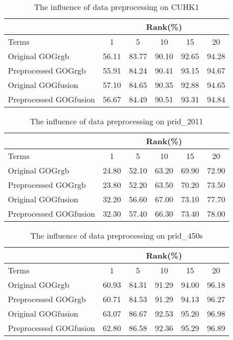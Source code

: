 \begin{table}[H]
\centering
\caption{The influence of data preprocessing on CUHK1}
\begin{tabular}{|l|c|c|c|c|c|}
\hline
 & \multicolumn{5}{|c|}{Rank(\%)} \\
 \hline
Terms  &1 &5 & 10 &15& 20\\
\hline
Original GOGrgb&56.11&83.77&90.10& 92.65&94.28 \\
\hline
Preprocessed GOGrgb &55.91&84.24&90.41& 93.15&94.67\\
 \hline
Original GOGfusion &57.10&84.65& 90.35& 92.88&94.65\\
\hline
Preprocessed GOGfusion &56.67&84.49& 90.51& 93.31&94.84\\
 \hline
 
\end{tabular}
\end{table}
\label{table:compMN2}
\begin{table}[H]
\centering
\caption{The influence of data preprocessing on prid\_2011}
\begin{tabular}{|l|c|c|c|c|c|}
\hline
 & \multicolumn{5}{|c|}{Rank(\%)} \\
 \hline
Terms  &1 &5 & 10 &15& 20\\
\hline
Original GOGrgb&24.80& 52.10& 63.20& 69.90& 72.90\\
\hline
Preprocessed GOGrgb &23.80& 52.20& 63.50& 70.20& 73.50\\
\hline
Original GOGfusion &32.20& 56.60& 67.00& 73.10& 77.70\\
\hline
Preprocessed GOGfusion &32.30& 57.40& 66.30& 73.40& 78.00\\
 \hline
 
\end{tabular}
\end{table}
\label{compMN3}
\begin{table}[H]
\centering
\caption{The influence of data preprocessing on prid\_450s}
\begin{tabular}{|l|c|c|c|c|c|}
\hline
 & \multicolumn{5}{|c|}{Rank(\%)} \\
 \hline
Terms  &1 &5 & 10 &15& 20\\
\hline
Original GOGrgb&60.93& 84.31& 91.29& 94.00& 96.18\\
\hline
Preprocessed GOGrgb &60.71& 84.53& 91.29& 94.13& 96.27\\
\hline
Original GOGfusion &63.07& 86.67& 92.53& 95.20& 96.98\\
\hline
Preprocessed GOGfusion &62.80& 86.58& 92.36& 95.29& 96.89\\
 \hline
 
\end{tabular}
\end{table}
